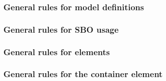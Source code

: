 \begin{sbmlenum}

\end{sbmlenum} \subsubsection*{General rules for model definitions} \begin{sbmlenum}


\end{sbmlenum} \subsubsection*{General rules for SBO usage} \begin{sbmlenum}


\end{sbmlenum} \subsubsection*{General rules for  elements} \begin{sbmlenum}


\end{sbmlenum} \subsubsection*{General rules for the  container element} \begin{sbmlenum}


\end{sbmlenum}
